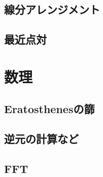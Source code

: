 \documentclass[landscape,twocolumn,9pt]{jsarticle}
\begin{document}
\subsection{線分アレンジメント}


\subsection{最近点対}


\section{数理}

\subsection{Eratosthenesの篩}


\subsection{逆元の計算など}


\subsection{FFT}

\end{document}
